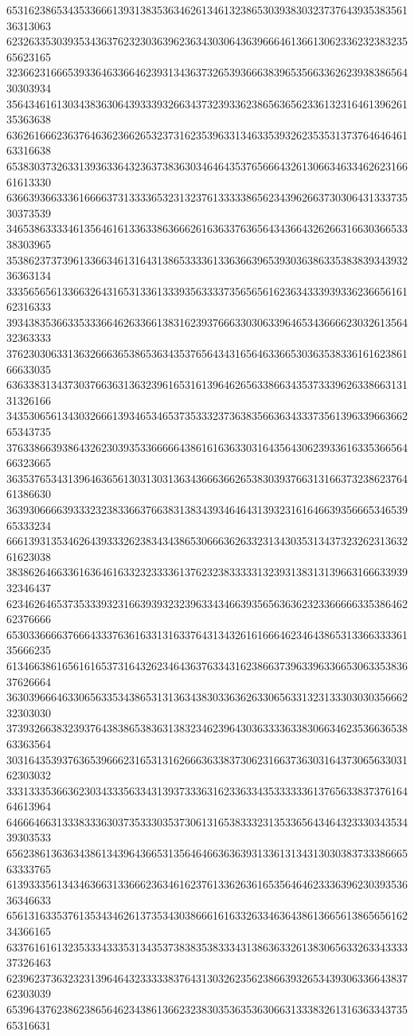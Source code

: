 65316238653435336661393138353634626134613238653039383032373764393538356136313063
62326335303935343637623230363962363430306436396664613661306233623238323565623165
32366231666539336463366462393134363732653936663839653566336262393838656430303934
35643461613034383630643933393266343732393362386563656233613231646139626135363638
63626166623637646362366265323731623539633134633539326235353137376464646163316638
65383037326331393633643236373836303464643537656664326130663463346262316661613330
63663936633361666637313333653231323761333338656234396266373030643133373530373539
34653863333461356461613363386366626163633763656434366432626631663036653338303965
35386237373961336634613164313865333361336366396539303638633538383934393236363134
33356565613366326431653133613339356333373565656162363433393933623665616162316333
39343835366335333664626336613831623937666330306339646534366662303261356432363333
37623030633136326663653865363435376564343165646336653036353833616162386166633035
63633831343730376636313632396165316139646265633866343537333962633866313131326166
34353065613430326661393465346537353332373638356636343337356139633966366265343735
37633866393864326230393533666664386161636330316435643062393361633536656466323665
36353765343139646365613031303136343666366265383039376631316637323862376461386630
36393066663933323238336637663831383439346464313932316164663935666534653965333234
66613931353462643933326238343438653066636263323134303531343732326231363261623038
38386264663361636461633232333361376232383333313239313831313966316663393932346437
62346264653735333932316639393232396334346639356563636232336666633538646262376666
65303366663766643337636163313163376431343261616664623464386531336633336135666235
61346638616561616537316432623464363763343162386637396339633665306335383637626664
36303966646330656335343865313136343830336362633065633132313330303035666232303030
37393266383239376438386538363138323462396430363333633830663462353663653863363564
30316435393763653966623165313162666363383730623166373630316437306563303162303032
33313335366362303433356334313937333631623363343533333361376563383737616464613964
64666466313338333630373533303537306131653833323135336564346432333034353439303533
65623861363634386134396436653135646466363639313361313431303038373338666563333765
61393335613434636631336662363461623761336263616535646462333639623039353636346633
65613163353761353434626137353430386661616332633463643861366561386565616234366165
63376161613235333433353134353738383538333431386363326138306563326334333337326463
62396237363232313964643233333837643130326235623866393265343930633664383762303039
65396437623862386564623438613662323830353635363066313338326131636334373565316631
